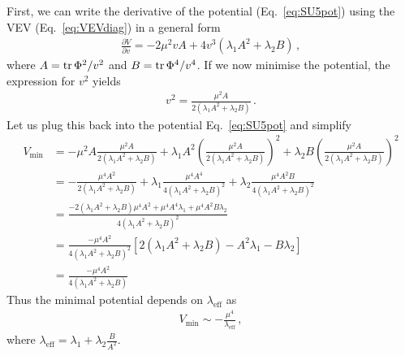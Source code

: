First, we can write the derivative of the potential (Eq.~\eqref{eq:SU5pot}) using the VEV (Eq.~\eqref{eq:VEVdiag}) in a general form
\begin{align}
    \frac{\partial V}{\partial v}=-2\mu^2 v A+4v^3(\lambda_1A^2+\lambda_2B)\,,
\end{align}
where $A=\operatorname{tr}\Phi^2/v^2$ and $B=\operatorname{tr}\Phi^4/v^4$. If we now minimise the potential, the expression for $v^2$ yields
\begin{align}
    v^2=\frac{\mu^2 A}{2(\lambda_1A^2+\lambda_2B)} \,.\label{eq:VEVvalue}
\end{align}
Let us plug this back into the potential Eq.~\eqref{eq:SU5pot} and simplify 
\begin{align}
    V_{\min}&=-\mu^2A\frac{\mu^2 A}{2(\lambda_1A^2+\lambda_2B)}+\lambda_1A^2\left(\frac{\mu^2 A}{2(\lambda_1A^2+\lambda_2B)}\right)^2+\lambda_2B\left(\frac{\mu^2 A}{2(\lambda_1A^2+\lambda_2B)}\right)^2
    \nonumber\\
    &=-\frac{\mu^4 A^2}{2(\lambda_1A^2+\lambda_2B)}+\lambda_1\frac{\mu^4 A^4}{4(\lambda_1A^2+\lambda_2B)^2}+\lambda_2\frac{\mu^4 A^2B}{4(\lambda_1A^2+\lambda_2B)^2}
    \nonumber\\
    &=\frac{-2(\lambda_1A^2+\lambda_2B)\mu^4 A^2+\mu^4 A^4\lambda_1+\mu^4 A^2B\lambda_2}{4(\lambda_1A^2+\lambda_2B)^2}
     \nonumber\\
    &=\frac{-\mu^4A^2}{4(\lambda_1A^2+\lambda_2B)^2}\left[2(\lambda_1A^2+\lambda_2B)-A^2\lambda_1-B\lambda_2\right]
    \nonumber\\
    &=\frac{-\mu^4A^2}{4(\lambda_1A^2+\lambda_2B)}
\end{align}
Thus the minimal potential depends on $\lambda_{\text{eff}}$ as
\begin{align}
    V_{{\min}}\sim-\frac{\mu^4}{\lambda_{\text{eff}}}\,,\label{eq:1/lambdaeff}
\end{align}
where $\lambda_{\text{eff}}=\lambda_1+\lambda_2\frac{B}{A^2}$. 

